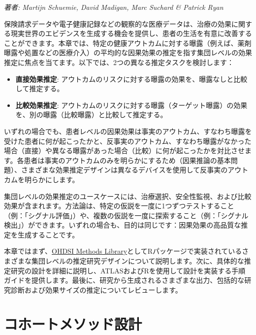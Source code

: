 \documentclass[
  11pt]{book}
\providecommand{\tightlist}{%
  \setlength{\itemsep}{0pt}\setlength{\parskip}{0pt}}
\theoremstyle{definition}
\theoremstyle{definition}
\theoremstyle{definition}
\theoremstyle{definition}
\theoremstyle{remark}
\begin{document}
\emph{著者: Martijn Schuemie, David Madigan, Marc Suchard \& Patrick Ryan}


保険請求データや電子健康記録などの観察的な医療データは、治療の効果に関する現実世界のエビデンスを生成する機会を提供し、患者の生活を有意に改善することができます。本章では、特定の健康アウトカムに対する曝露（例えば、薬剤曝露や処置などの医療介入）の平均的な因果効果の推定を指す集団レベルの効果推定に焦点を当てます。以下では、2つの異なる推定タスクを検討します：

\begin{itemize}
\tightlist
\item
  \textbf{直接効果推定}: アウトカムのリスクに対する曝露の効果を、曝露なしと比較して推定する。 
\item
  \textbf{比較効果推定}: アウトカムのリスクに対する曝露（ターゲット曝露）の効果を、別の曝露（比較曝露）と比較して推定する。 
\end{itemize}

いずれの場合でも、患者レベルの因果効果は事実のアウトカム、すなわち曝露を受けた患者に何が起こったかと、反事実のアウトカム、すなわち曝露がなかった場合（直接）や異なる曝露があった場合（比較）に何が起こったかを対比させます。各患者は事実のアウトカムのみを明らかにするため（因果推論の基本問題）、さまざまな効果推定デザインは異なるデバイスを使用して反事実のアウトカムを明らかにします。 

集団レベルの効果推定のユースケースには、治療選択、安全性監視、および比較効果が含まれます。方法論は、特定の仮説を一度に1つずつテストすること（例：「シグナル評価」）や、複数の仮説を一度に探索すること（例：「シグナル検出」）ができます。いずれの場合も、目的は同じです：因果効果の高品質な推定を生成することです。  

本章ではまず、\href{https://ohdsi.github.io/MethodsLibrary/}{OHDSI Methods Library}としてRパッケージで実装されているさまざまな集団レベルの推定研究デザインについて説明します。次に、具体的な推定研究の設計を詳細に説明し、ATLASおよびRを使用して設計を実装する手順ガイドを提供します。最後に、研究から生成されるさまざまな出力、包括的な研究診断および効果サイズの推定についてレビューします。

\section{コホートメソッド設計}\label{CohortMethod}
\end{document}

